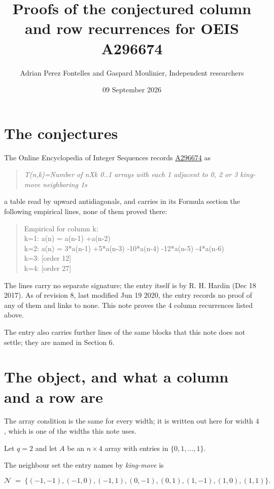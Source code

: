 \documentclass[11pt]{article}
\title{Proofs of the conjectured column and row recurrences for OEIS A296674}
\author{Adrian Perez Fontelles and Gaspard Moulinier, Independent researchers}
\date{09 September 2026}
\theoremstyle{definition}
\begin{document}
\maketitle
\section{The conjectures}

The Online Encyclopedia of Integer Sequences records \href{https://oeis.org/A296674}{A296674} as

\begin{quote}\itshape T(n,k)=Number of nXk 0..1 arrays with each 1 adjacent to 0, 2 or 3 king-move neighboring 1s\end{quote}

a table read by upward antidiagonals, and carries in its Formula section the following empirical lines, none of them proved there:

\begin{quote}\ttfamily Empirical for column k:\\
k=1: a(n) = a(n-1) +a(n-2)\\k=2: a(n) = 3*a(n-1) +5*a(n-3) -10*a(n-4) -12*a(n-5) -4*a(n-6)\\k=3: [order 12]\\k=4: [order 27]\end{quote}

The lines carry no separate signature; the entry itself is by R. H. Hardin (Dec 18 2017). As of revision 8, last modified Jun 19 2020, the entry records no proof of any of them and links to none. This note proves the 4 column recurrences listed above.

The entry also carries further lines of the same blocks that this note does not settle; they are named in Section 6.

\section{The object, and what a column and a row are}

The array condition is the same for every width; it is written out here for width $4$, which is one of the widths this note uses.

Let $q = 2$ and let $A$ be an $n \times 4$ array with entries in $\{0,1,\dots,1\}$.

The neighbour set the entry names by {\itshape king-move} is

\[\mathcal{N} \;=\; \{(-1,-1), (-1,0), (-1,1), (0,-1), (0,1), (1,-1), (1,0), (1,1)\}.\]
\end{document}
